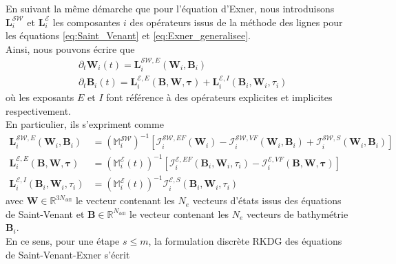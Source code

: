 \documentclass[11pt, a4paper, oneside]{report}
\begin{document}
En suivant la même démarche que pour l'équation d'Exner, nous introduisons $\bm{L}_i^\mathcal{SW}$ et $\bm{L}_i^\mathcal{E}$ les composantes $i$ des opérateurs issus de la méthode des lignes pour les équations \eqref{eq:Saint_Venant} et \eqref{eq:Exner_generalisee}. \\
Ainsi, nous pouvons écrire que
\begin{equation}
    \begin{aligned}
        & \partial_t \bm{W}_i(t) = \bm{L}_i^{\mathcal{SW}, E} \left( \bm{W}_i, \bm{B}_i \right) \\
        & \partial_t \bm{B}_i(t) = \bm{L}_i^{\mathcal{E}, E} \left( \bm{B}, \bm{W}, \bm{\tau} \right) + \bm{L}_i^{\mathcal{E}, I} \left( \bm{B}_i, \bm{W}_i, \tau_i \right)
    \end{aligned}
\end{equation}
où les exposants $E$ et $I$ font référence à des opérateurs explicites et implicites respectivement. \\
En particulier, ils s'expriment comme
\begin{equation}
    \begin{aligned}
        \bm{L}_i^{\mathcal{SW}, E} \left( \bm{W}_i, \bm{B}_i \right) & = \left( \mathbb{M}_i^\mathcal{SW} \right)^{-1} \left[ \bm{\mathcal{I}}_i^{\mathcal{SW}, EF} \left( \bm{W}_i \right) - \bm{\mathcal{I}}_i^{\mathcal{SW}, VF} \left( \bm{W}_i, \bm{B}_i \right) + \bm{\mathcal{I}}_i^{\mathcal{SW}, S} \left( \bm{W}_i, \bm{B}_i \right) \right] \\
        \bm{L}_i^{\mathcal{E}, E} \left( \bm{B}, \bm{W}, \bm{\tau} \right) & = \left( \mathbb{M}_i^\mathcal{E}(t) \right)^{-1} \left[ \bm{\mathcal{I}}_i^{\mathcal{E}, EF} \left( \bm{B}_i, \bm{W}_i, \tau_i \right) - \bm{\mathcal{I}}_i^{\mathcal{E}, VF} \left( \bm{B}, \bm{W}, \bm{\tau} \right) \right] \\
        \bm{L}_i^{\mathcal{E}, I} \left( \bm{B}_i, \bm{W}_i, \tau_i \right) & = \left( \mathbb{M}_i^\mathcal{E}(t) \right)^{-1} \bm{\mathcal{I}}_i^{\mathcal{E}, S} \left( \bm{B}_i, \bm{W}_i , \tau_i \right)
    \end{aligned}
\end{equation}
avec $\bm{W} \in \mathbb{R}^{3N_\text{ddl}}$ le vecteur contenant les $N_e$ vecteurs d'états issus des équations de Saint-Venant et $\bm{B} \in \mathbb{R}^{N_\text{ddl}}$ le vecteur contenant les $N_e$ vecteurs de bathymétrie $\bm{B}_i$. \\
En ce sens, pour une étape $s \leq m$, la formulation discrète RKDG des équations de Saint-Venant-Exner s'écrit
\end{document}
